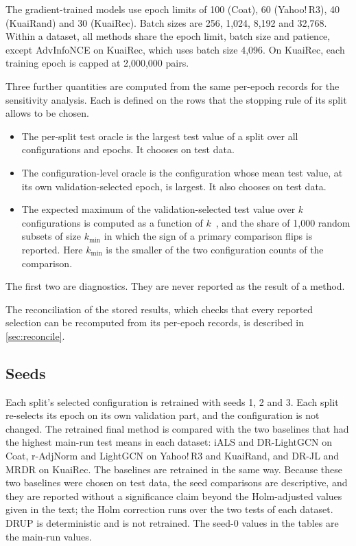The gradient-trained models use epoch limits of 100 (Coat), 60 (Yahoo!\,R3), 40 (KuaiRand) and 30 (KuaiRec).
Batch sizes are 256, 1{,}024, 8{,}192 and 32{,}768. Within a dataset, all methods share the epoch limit,
batch size and patience, except AdvInfoNCE on KuaiRec, which uses batch size 4{,}096. On KuaiRec, each
training epoch is capped at 2{,}000{,}000 pairs.

Three further quantities are computed from the same per-epoch records for the sensitivity analysis. Each is defined on the
rows that the stopping rule of its split allows to be chosen.
\begin{itemize}
\item The per-split test oracle is the largest test value of a split over all configurations and epochs.
It chooses on test data.
\item The configuration-level oracle is the configuration whose mean test value, at its own
validation-selected epoch, is largest. It also chooses on test data.
\item The expected maximum of the validation-selected test value over $k$ configurations is computed as a
function of $k$~\citep{dodge2019showyourwork}, and the share of 1{,}000 random subsets of size $k_{\min}$ in
which the sign of a primary comparison flips is reported. Here $k_{\min}$ is the smaller of the two configuration
counts of the comparison.
\end{itemize}
The first two are diagnostics. They are never reported as the result of a method.

The reconciliation of the stored results, which checks that every reported selection can be recomputed from its per-epoch records, is described in \ref{sec:reconcile}.

\subsection{Seeds}\label{sec:seeds}

Each split's selected configuration is retrained with seeds 1, 2 and 3. Each split re-selects its epoch on
its own validation part, and the configuration is not changed. The retrained final method is compared with
the two baselines that had the highest main-run test means in each dataset: iALS and DR-LightGCN on Coat,
r-AdjNorm and LightGCN on Yahoo!\,R3 and KuaiRand, and DR-JL and MRDR on KuaiRec. The baselines are retrained
in the same way. Because these two baselines were chosen on test data, the seed comparisons are descriptive,
and they are reported without a significance claim beyond the Holm-adjusted values given in the text; the
Holm correction runs over the two tests of each dataset. DRUP is deterministic and is not retrained.
The seed-0 values in the tables are the main-run values.

